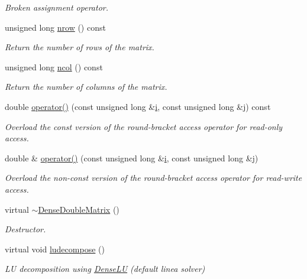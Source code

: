 \begin{DoxyCompactItemize}
\begin{DoxyCompactList}\small\item\em Broken assignment operator. \end{DoxyCompactList}\item 
unsigned long \hyperlink{classoomph_1_1DenseDoubleMatrix_ab67993d1a41ca5ddf05c8210673723f0}{nrow} () const
\begin{DoxyCompactList}\small\item\em Return the number of rows of the matrix. \end{DoxyCompactList}\item 
unsigned long \hyperlink{classoomph_1_1DenseDoubleMatrix_aec36d12984999f29f5fc21feea55df1d}{ncol} () const
\begin{DoxyCompactList}\small\item\em Return the number of columns of the matrix. \end{DoxyCompactList}\item 
double \hyperlink{classoomph_1_1DenseDoubleMatrix_ae41c14d2d7e4b5b568a9b371e7e53fbd}{operator()} (const unsigned long \&\hyperlink{cfortran_8h_adb50e893b86b3e55e751a42eab3cba82}{i}, const unsigned long \&j) const
\begin{DoxyCompactList}\small\item\em Overload the const version of the round-\/bracket access operator for read-\/only access. \end{DoxyCompactList}\item 
double \& \hyperlink{classoomph_1_1DenseDoubleMatrix_a7314543c82d096181957979f2c16127c}{operator()} (const unsigned long \&\hyperlink{cfortran_8h_adb50e893b86b3e55e751a42eab3cba82}{i}, const unsigned long \&j)
\begin{DoxyCompactList}\small\item\em Overload the non-\/const version of the round-\/bracket access operator for read-\/write access. \end{DoxyCompactList}\item 
virtual \hyperlink{classoomph_1_1DenseDoubleMatrix_a5b68ac6eb31db9b0221d0dd724bcc3a6}{$\sim$\+Dense\+Double\+Matrix} ()
\begin{DoxyCompactList}\small\item\em Destructor. \end{DoxyCompactList}\item 
virtual void \hyperlink{classoomph_1_1DenseDoubleMatrix_a741d54dbea2a16e6e3f10bbd2d9d726e}{ludecompose} ()
\begin{DoxyCompactList}\small\item\em LU decomposition using \hyperlink{classoomph_1_1DenseLU}{Dense\+LU} (default linea solver) \end{DoxyCompactList}\item 

\end{DoxyCompactItemize}
